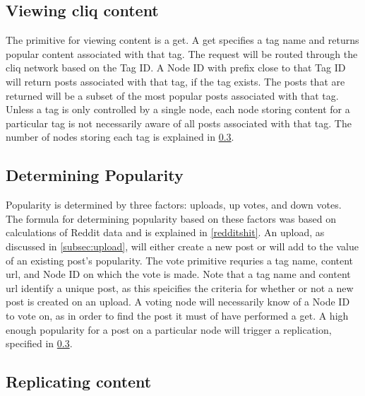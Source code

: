 \documentclass{sig-alternate}
\begin{document}
\subsection{Viewing cliq content}

The primitive for viewing content is a get. 
A get specifies a tag name and returns popular content associated with that tag. 
The request will be routed through the cliq network based on the Tag ID. 
A Node ID with prefix close to that Tag ID will return posts associated with that tag, if the tag exists. 
The posts that are returned will be a subset of the most popular posts associated with that tag. 
Unless a tag is only controlled by a single node, each node storing content for a particular tag is not necessarily aware of all posts associated with that tag. 
The number of nodes storing each tag is explained in \ref{subsec:replication}. 

\subsection{Determining Popularity}
\label{subsec:popularity}

Popularity is determined by three factors: uploads, up votes, and down votes. 
The formula for determining popularity based on these factors was based on calculations of Reddit data and is explained in \ref{redditshit}.
An upload, as discussed in \ref{subsec:upload}, will either create a new post or will add to the value of an existing post's popularity. 
The vote primitive requries a tag name, content url, and Node ID on which the vote is made. 
Note that a tag name and content url identify a unique post, as this speicifies the criteria for whether or not a new post is created on an upload. 
A voting node will necessarily know of a Node ID to vote on, as in order to find the post it must of have performed a get. 
A high enough popularity for a post on a particular node will trigger a replication, specified in \ref{subsec:replication}. 

\subsection{Replicating content}
\label{subsec:replication}
\end{document}
